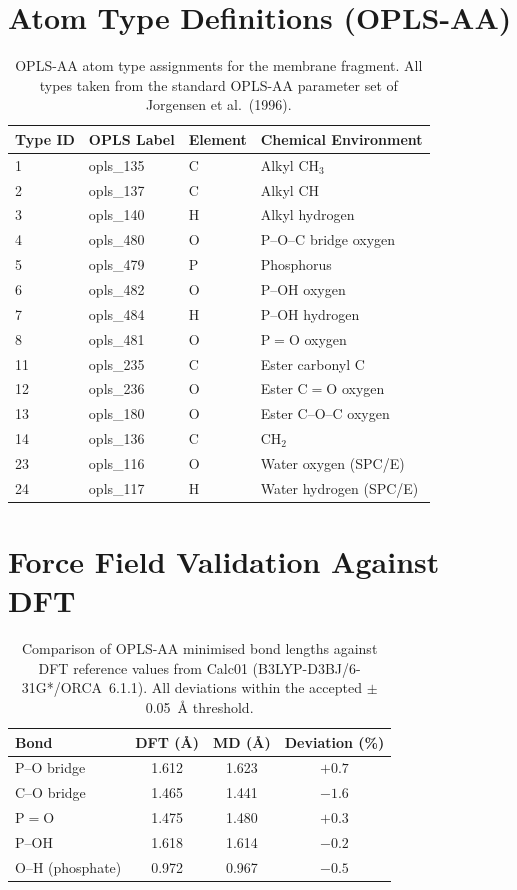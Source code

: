 \documentclass[12pt,a4paper]{report}
\begin{document}
\section{Atom Type Definitions (OPLS-AA)}

\begin{table}[h]
\centering
\caption{OPLS-AA atom type assignments for the membrane 
fragment. All types taken from the standard OPLS-AA 
parameter set of Jorgensen et al.\ (1996).}
\label{tab:opls-types}
\begin{tabular}{llll}
\toprule
Type ID & OPLS Label & Element & Chemical Environment \\
\midrule
1  & opls\_135 & C & Alkyl CH\(_3\) \\
2  & opls\_137 & C & Alkyl CH \\
3  & opls\_140 & H & Alkyl hydrogen \\
4  & opls\_480 & O & P--O--C bridge oxygen \\
5  & opls\_479 & P & Phosphorus \\
6  & opls\_482 & O & P--OH oxygen \\
7  & opls\_484 & H & P--OH hydrogen \\
8  & opls\_481 & O & P\(=\)O oxygen \\
11 & opls\_235 & C & Ester carbonyl C \\
12 & opls\_236 & O & Ester C\(=\)O oxygen \\
13 & opls\_180 & O & Ester C--O--C oxygen \\
14 & opls\_136 & C & CH\(_2\) \\
23 & opls\_116 & O & Water oxygen (SPC/E) \\
24 & opls\_117 & H & Water hydrogen (SPC/E) \\
\bottomrule
\end{tabular}
\end{table}

\section{Force Field Validation Against DFT}

\begin{table}[h]
\centering
\caption{Comparison of OPLS-AA minimised bond lengths against 
DFT reference values from Calc01 (B3LYP-D3BJ/6-31G*/ORCA~6.1.1). 
All deviations within the accepted $\pm$0.05~\AA{} threshold.}
\label{tab:ff-validation}
\begin{tabular}{lccc}
\toprule
Bond & DFT (\AA{}) & MD (\AA{}) & Deviation (\%) \\
\midrule
P--O bridge & 1.612 & 1.623 & $+0.7$ \\
C--O bridge & 1.465 & 1.441 & $-1.6$ \\
P\(=\)O     & 1.475 & 1.480 & $+0.3$ \\
P--OH       & 1.618 & 1.614 & $-0.2$ \\
O--H (phosphate) & 0.972 & 0.967 & $-0.5$ \\
\bottomrule
\end{tabular}
\end{table}
\end{document}
